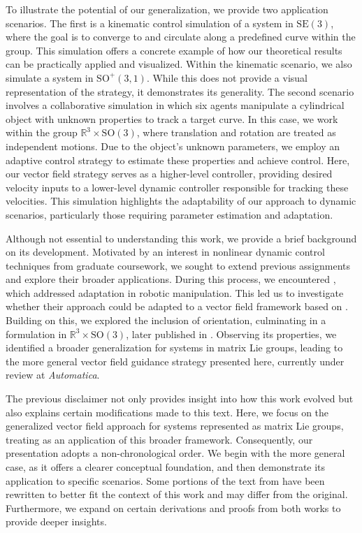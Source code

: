 To illustrate the potential of our generalization, we provide two application scenarios. The first is a kinematic control simulation of a system in $\text{SE}(3)$, where the goal is to converge to and circulate along a predefined curve within the group. This simulation offers a concrete example of how our theoretical results can be practically applied and visualized. Within the kinematic scenario, we also simulate a system in $\text{SO}^+(3,1)$. While this does not provide a visual representation of the strategy, it demonstrates its generality. The second scenario involves a collaborative simulation in which six agents manipulate a cylindrical object with unknown properties to track a target curve. In this case, we work within the group $\mathbb{R}^3\times\text{SO}(3)$, where translation and rotation are treated as independent motions. Due to the object's unknown parameters, we employ an adaptive control strategy to estimate these properties and achieve control. Here, our vector field strategy serves as a higher-level controller, providing desired velocity inputs to a lower-level dynamic controller responsible for tracking these velocities. This simulation highlights the adaptability of our approach to dynamic scenarios, particularly those requiring parameter estimation and adaptation.

Although not essential to understanding this work, we provide a brief background on its development. Motivated by an interest in nonlinear dynamic control techniques from graduate coursework, we sought to extend previous assignments and explore their broader applications. During this process, we encountered \citet{Culbertson2021}, which addressed adaptation in robotic manipulation. This led us to investigate whether their approach could be adapted to a vector field framework based on \citet{Rezende2022}. Building on this, we explored the inclusion of orientation, culminating in a formulation in $\mathbb{R}^3\times\text{SO}(3)$, later published in \citet{Pessoa2024}. Observing its properties, we identified a broader generalization for systems in matrix Lie groups, leading to the more general vector field guidance strategy presented here, currently under review at \textit{Automatica}.

The previous disclaimer not only provides insight into how this work evolved but also explains certain modifications made to this text. Here, we focus on the generalized vector field approach for systems represented as matrix Lie groups, treating \citet{Pessoa2024} as an application of this broader framework. Consequently, our presentation adopts a non-chronological order. We begin with the more general case, as it offers a clearer conceptual foundation, and then demonstrate its application to specific scenarios. Some portions of the text from \citet{Pessoa2024} have been rewritten to better fit the context of this work and may differ from the original. Furthermore, we expand on certain derivations and proofs from both works to provide deeper insights.

